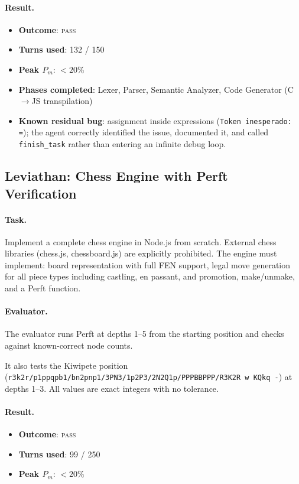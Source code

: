 \documentclass[11pt,a4paper]{article}
\newcommand{\Pm}{\ensuremath{P_m}}
\begin{document}
\paragraph{Result.}
\begin{itemize}[leftmargin=*]
  \item \textbf{Outcome}: \textsc{pass}
  \item \textbf{Turns used}: 132 / 150
  \item \textbf{Peak \Pm}: $<20\%$
  \item \textbf{Phases completed}: Lexer, Parser, Semantic Analyzer,
        Code Generator (C$\to$JS transpilation)
  \item \textbf{Known residual bug}: assignment inside expressions
        (\texttt{Token inesperado: =}); the agent correctly identified
        the issue, documented it, and called \texttt{finish\_task}
        rather than entering an infinite debug loop.
\end{itemize}

\subsection{Leviathan: Chess Engine with Perft Verification}

\paragraph{Task.}
Implement a complete chess engine in Node.js from scratch.
External chess libraries (chess.js, chessboard.js) are explicitly prohibited.
The engine must implement: board representation with full FEN support,
legal move generation for all piece types including castling, en passant,
and promotion, make/unmake, and a Perft function.

\paragraph{Evaluator.}
The evaluator runs Perft at depths 1--5 from the starting position and
checks against known-correct node counts.

It also tests the Kiwipete position (\texttt{r3k2r/p1ppqpb1/bn2pnp1/3PN3/1p2P3/2N2Q1p/PPPBBPPP/R3K2R w KQkq -})
at depths 1--3.
All values are exact integers with no tolerance.

\paragraph{Result.}
\begin{itemize}[leftmargin=*]
  \item \textbf{Outcome}: \textsc{pass}
  \item \textbf{Turns used}: 99 / 250
  \item \textbf{Peak \Pm}: $<20\%$
\end{itemize}
\end{document}
